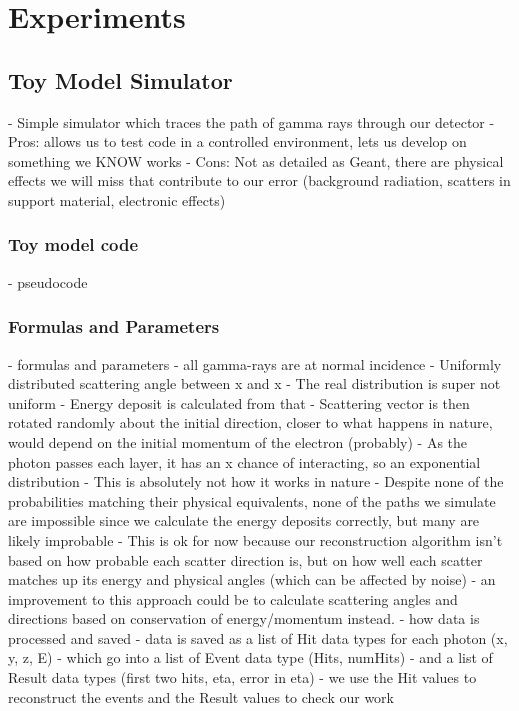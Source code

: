 \chapter{Experiments}

\section{Toy Model Simulator}
- Simple simulator which traces the path of gamma rays through our detector
- Pros: allows us to test code in a controlled environment, lets us develop on something we KNOW works
- Cons: Not as detailed as Geant, there are physical effects we will miss that contribute to our error (background radiation, scatters in support material, electronic effects)
\subsection{Toy model code}
- pseudocode
\subsection{Formulas and Parameters}
- formulas and parameters
    - all gamma-rays are at normal incidence
    - Uniformly distributed scattering angle between x and x
    - The real distribution is super not uniform
    - Energy deposit is calculated from that
    - Scattering vector is then rotated randomly about the initial direction, closer to what happens in nature, would depend on the initial momentum of the electron (probably)
    - As the photon passes each layer, it has an x chance of interacting, so an exponential distribution
    - This is absolutely not how it works in nature
    - Despite none of the probabilities matching their physical equivalents, none of the paths we simulate are impossible since we calculate the energy deposits correctly, but many are likely improbable
    - This is ok for now because our reconstruction algorithm isn't based on how probable each scatter direction is, but on how well each scatter matches up its energy and physical angles (which can be affected by noise)
    - an improvement to this approach could be to calculate scattering angles and directions based on conservation of energy/momentum instead.
- how data is processed and saved
    - data is saved as a list of Hit data types for each photon (x, y, z, E)
    - which go into a list of Event data type (Hits, numHits)
    - and a list of Result data types (first two hits, eta, error in eta)
    - we use the Hit values to reconstruct the events and the Result values to check our work
    
